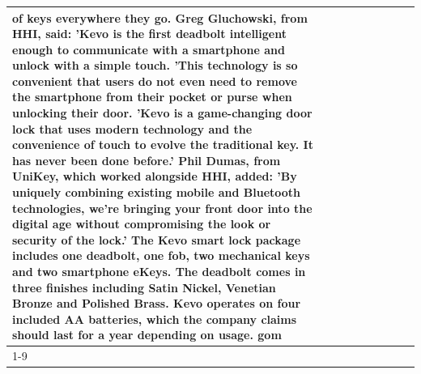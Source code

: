\begin{table}[H]
\begin{tabular}{lllrlllll}
of keys everywhere they go. Greg Gluchowski, from HHI, said: 'Kevo is the first deadbolt intelligent enough to communicate with a smartphone and unlock with a simple touch. 'This technology is so convenient that users do not even need to remove the smartphone from their pocket or purse when unlocking their door. 'Kevo is a game-changing door lock that uses modern technology and the convenience of touch to evolve the traditional key. It has never been done before.' Phil Dumas, from UniKey, which worked alongside HHI, added: 'By uniquely combining existing mobile and Bluetooth technologies, we’re bringing your front door into the digital age without compromising the look or security of the lock.' The Kevo smart lock package includes one deadbolt, one fob, two mechanical keys and two smartphone eKeys. The deadbolt comes in three finishes including Satin Nickel, Venetian Bronze and Polished Brass. Kevo operates on four included AA batteries, which the company claims should last for a year depending on usage. gom \\
\cline{1-9}

\end{tabular}
\end{table}
